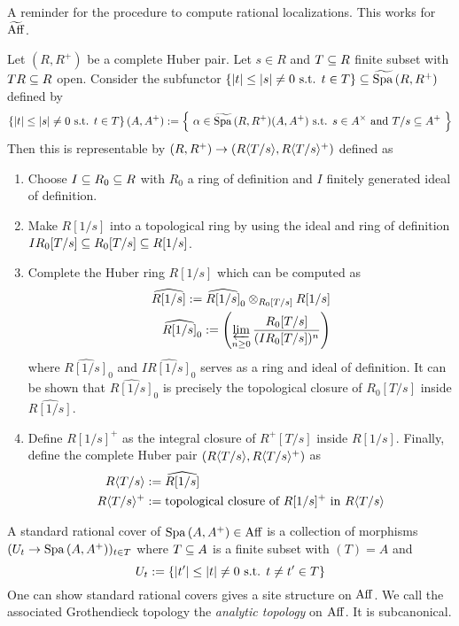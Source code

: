 \documentclass{article}
\begin{document}
A reminder for the procedure to compute rational localizations.
This works for $\widetilde{\mathrm{Aff}}$.
\begin{prop}
  Let $(R , R^+)$ be a complete Huber pair.
  Let $s \in R$ and $T \subseteq R$ finite subset with $TR \subseteq R$ open.
  Consider the subfunctor 
  $\left\{\left\vert t \right\vert \leq \left\vert s \right\vert \neq 0 \text{ s.t. } t \in T\right\} \subseteq \widetilde{\mathrm{Spa}\,}(R , R^+)$
  defined by \[
    \left\{\left\vert t \right\vert \leq \left\vert s \right\vert \neq 0 \text{ s.t. } t \in T\right\}(A , A^+) := \left\{
      \text{ $\alpha \in \widetilde{\mathrm{Spa}\,}(R , R^+)(A , A^+) 
      \text{ s.t. } s \in A^\times$ and
      $T / s \subseteq A^+$
      }
    \right\}
  \]
  Then this is representable by $(R , R^+) \to (R\langle T / s\rangle , R\langle T / s\rangle^+)$
  defined as 
  \begin{enumerate}
    \item Choose $I \subseteq R_0 \subseteq R$ with $R_0$ a ring of definition
    and $I$ finitely generated ideal of definition.
    \item Make $R[1 / s]$ into a topological ring by 
    using the ideal and ring of definition 
    $I R_0 [T / s] \subseteq R_0[T / s] \subseteq R[1 / s]$.
    \item Complete the Huber ring $R[1 / s]$ 
    which can be computed as \begin{align*}
      \widehat{R[1 / s]} := 
      \widehat{R[1/s]}_0 \otimes_{R_0[T / s]} R[1 / s] \\
      \widehat{R[1/s]}_0 := \left(\varprojlim_{n \geq 0} \frac{R_0[T / s]}{(I R_0[T / s])^n}\right) 
    \end{align*}
    where $\widehat{R[1/s]}_0$ and $I \widehat{R[1/s]}_0$ serves as
    a ring and ideal of definition.
    It can be shown that $\widehat{R[1/s]}_0$
    is precisely the topological closure of $R_0[T/s]$ inside 
    $\widehat{R[1 / s]}$.
    \item Define $R[1 / s]^+$ as the integral closure of
    $R^+[T / s]$ inside $R[1 / s]$.
    Finally, define the complete Huber pair $(R\langle T / s\rangle , R\langle T / s\rangle^+)$
    as \begin{align*}
      R\langle T / s\rangle &:= \widehat{R[1 / s]} \\
      R\langle T / s\rangle^+ &:= \text{topological closure of $R[1 / s]^+$ in $R\langle T / s\rangle$}
    \end{align*}
  \end{enumerate}
  \cite[Theorem 3.1.3]{SW20}
\end{prop} 
\begin{dfn}
  
  A standard rational cover of $\mathrm{Spa}\,(A , A^+) \in \mathrm{Aff}$ is
  a collection of morphisms $(U_t \to \mathrm{Spa}\,(A , A^+))_{t \in T}$
  where $T \subseteq A$ is a finite subset with $(T) = A$ and 
  \[
    U_t := \left\{\left\vert t^\prime \right\vert \leq \left\vert t \right\vert \neq 0 \text{ s.t. } t \neq t^\prime \in T\right\}
  \]
  \cite[Def. IV.2.3.1]{Mor19}
  One can show standard rational covers
  gives a site structure on $\mathrm{Aff}$.
  We call the associated Grothendieck topology
  the \emph{analytic topology} on $\mathrm{Aff}$.
  It is subcanonical.
\end{dfn}
\end{document}
